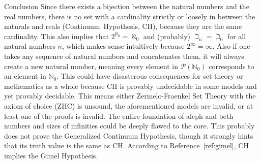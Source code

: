 \documentclass[12pt]{article}
\begin{document}
\begin{section}{Conclusion}\label{sec:conclusion}
	Since there exists a bijection between the natural numbers and the real numbers, there is no set
	with a cardinality strictly or loosely in between the naturals and reals (Continuum~Hypothesis,
	CH), because they are the same cardinality. This also implies that $2^{\aleph_0}=\aleph_0$ and
	(probably) $\beth_n=\beth_0$ for all natural numbers $n$, which makes sense intuitively because
	$2^\infty=\infty$. Also if one takes any sequence of natural numbers and concatenates them, it
	will always create a new natural number, meaning every element in $\mathcal P(\mathbb N_0)$
	corresponds to an element in $\mathbb N_0$. This could have disasterous consequences for set
	theory or methematics as a whole because CH is provably undecidable in some models and yet
	provably decidable. This means either Zermelo-Fraenkel Set Theory with the axiom of choice (ZHC)
	is unsound, the aforementioned models are invalid, or at least one of the proofs is invalid. The
	entire foundation of aleph and beth numbers and sizes of infinities could be deeply flawed to
	the core. This probably does not prove the Generalized Continuum Hypothesis, though it strongly
	hints that its truth value is the same as CH. According to Reference~\ref{ref:gimel}, CH implies
	the Gimel Hypothesis.
\end{section}
\end{document}
